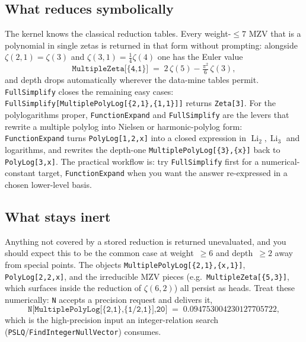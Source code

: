 \documentclass[11pt]{article}
\DeclareMathOperator{\Li}{Li}
\theoremstyle{plain}
\theoremstyle{remark}
\begin{document}
\subsection{What reduces symbolically}

The kernel knows the classical reduction tables. Every weight-$\le 7$ MZV that is a polynomial in single zetas is returned in that form without prompting: alongside $\zeta(2,1)=\zeta(3)$ and $\zeta(3,1)=\tfrac14\zeta(4)$ one has the Euler value
\[
  \texttt{MultipleZeta[\{4,1\}]}\;=\;2\,\zeta(5)-\tfrac{\pi^2}{6}\,\zeta(3),
\]
and depth drops automatically wherever the data-mine tables permit. \texttt{FullSimplify} closes the remaining easy cases: \texttt{FullSimplify[MultiplePolyLog[\{2,1\},\{1,1\}]]} returns \texttt{Zeta[3]}. For the polylogarithms proper, \texttt{FunctionExpand} and \texttt{FullSimplify} are the levers that rewrite a multiple polylog into Nielsen or harmonic-polylog form: \texttt{FunctionExpand} turns \texttt{PolyLog[1,2,x]} into a closed expression in $\Li_2,\Li_3$ and logarithms, and rewrites the depth-one \texttt{MultiplePolyLog[\{3\},\{x\}]} back to \texttt{PolyLog[3,x]}. The practical workflow is: try \texttt{FullSimplify} first for a numerical-constant target, \texttt{FunctionExpand} when you want the answer re-expressed in a chosen lower-level basis.

\subsection{What stays inert}\label{ssec:inert}

Anything not covered by a stored reduction is returned unevaluated, and you should expect this to be the common case at weight~$\ge 6$ and depth~$\ge 2$ away from special points. The objects \texttt{MultiplePolyLog[\{2,1\},\{x,1\}]}, \texttt{PolyLog[2,2,x]}, and the irreducible MZV pieces (e.g.\ \texttt{MultipleZeta[\{5,3\}]}, which surfaces inside the reduction of $\zeta(6,2)$) all persist as heads. Treat these numerically: \texttt{N} accepts a precision request and delivers it,
\[
  \texttt{N[MultiplePolyLog[\{2,1\},\{1/2,1\}],20]}\;=\;0.094753004230127705722,
\]
which is the high-precision input an integer-relation search (\texttt{PSLQ}/\texttt{FindIntegerNullVector}) consumes.
\end{document}
